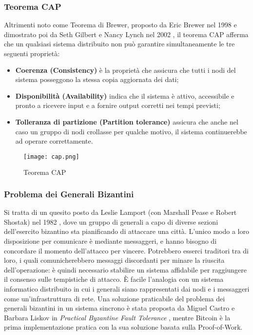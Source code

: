 		\subsubsection{Teorema CAP}\label{sec:teorema_CAP}
			Altrimenti noto come Teorema di Brewer, proposto da Eric Brewer nel 1998 e dimostrato poi da Seth Gilbert e Nancy Lynch nel 2002 \cite{CAP}, il teorema CAP afferma che un qualsiasi sistema distribuito non può garantire simultaneamente le tre seguenti proprietà:
			\begin{itemize}
				\item \textbf{Coerenza (Consistency)} è la proprietà che assicura che tutti i nodi del sistema posseggono la stessa copia aggiornata dei dati;
				\item \textbf{Disponibilità (Availability)} indica che il sistema è attivo, accessibile e pronto a ricevere input e a fornire output corretti nei tempi previsti;
				\item \textbf{Tolleranza di partizione (Partition tolerance)} assicura che anche nel caso un gruppo di nodi crollasse per qualche motivo, il sistema continuerebbe ad operare correttamente.
			\end{itemize}
			\begin{figure}[ht]
				\centering
				\texttt{[image: cap.png]}
				\caption{Teorema CAP \cite{cap_diagram}}
				\label{fig:cap}
			\end{figure}

		\subsubsection{Problema dei Generali Bizantini}
			Si tratta di un quesito posto da Leslie Lamport (con Marshall Pease e Robert Shostak) nel 1982 \cite{BGP}, dove un gruppo di generali a capo di diverse sezioni dell'esercito bizantino sta pianificando di attaccare una città. L'unico modo a loro disposizione per comunicare è mediante messaggeri, e hanno bisogno di concordare il momento dell'attacco per vincere. Potrebbero esserci traditori tra di loro, i quali comunicherebbero messaggi discordanti per minare la riuscita dell'operazione: è quindi necessario stabilire un sistema affidabile per raggiungere il consenso sulle tempistiche di attacco. È facile l'analogia con un sistema informatico distribuito in cui i generali siano rappresentati dai nodi e i messaggeri come un'infrastruttura di rete. Una soluzione praticabile del problema dei generali bizantini in un sistema sincrono è stata proposta da Miguel Castro e Barbara Liskov in \emph{Practical Byzantine Fault Tolerance} \cite{PBFT}, mentre Bitcoin è la prima implementazione pratica con la sua soluzione basata sulla Proof-of-Work.

